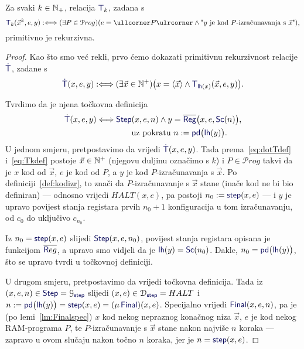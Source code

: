 \begin{propozicija}\label{prop:Tkprn}
Za svaki $k\in{\mathbb N}_+$, relacija $\f T_k$, zadana s
\begin{equation}\label{eq:Tkdef}
    \f T_k(\vec x^k,e,y):\Longleftrightarrow(\exists P\in\mathcal Prog)(e=\kprog{P}\land \text{"$y$ je kod $P$-izračunavanja s $\vec x$"})\text,
\end{equation}
primitivno je rekurzivna.
\end{propozicija}
\begin{proof}
Kao što smo već rekli, prvo ćemo dokazati primitivnu rekurzivnost relacije $\f{\dot T}$, zadane s
\begin{equation}\label{eq:dotTdef}
    \f{\dot T}(x,e,y):\Longleftrightarrow(\exists\vec x\in\N^+)\bigl(x=\langle\vec x\rangle\land\f T_{\f{lh}(x)}(\vec x,e,y)\bigr)\text.
\end{equation}

Tvrdimo da je njena točkovna definicija
\begin{align}
    \dot{\f T}(x,e,y)\Longleftrightarrow\f{Step}&(x,e,n)\land y=\overline{\f{Reg}}\bigl(x,e,\f{Sc}(n)\bigr)\text,\\
    &\text{uz pokratu }n:=\f{pd}\big(\f{lh}(y)\bigr)\text.
\end{align}
U jednom smjeru, pretpostavimo da vrijedi $\f{\dot T}(x,e,y)$. Tada prema~\eqref{eq:dotTdef} i~\eqref{eq:Tkdef} postoje $\vec x\in{\mathbb N}^+$ (njegovu duljinu označimo s $k$) i $P\in\mathcal Prog$ takvi da je $x$ kod od $\vec x$, $e$ je kod od $P$, a $y$ je kod $P$-izračunavanja s $\vec x$. Po definiciji~\ref{def:kodizr}, to znači da $P$-izračunavanje s $\vec x$ stane (inače kod ne bi bio definiran) --- odnosno vrijedi $HALT(x,e)$, pa postoji $n_0:=\f{step}(x,e)$ --- i $y$ je upravo povijest stanja registara prvih $n_0+1$ konfiguracija u tom izračunavanju, od $c_0$ do uključivo $c_{n_0}$.

Iz $n_0=\f{step}(x,e)$ slijedi $\f{Step}(x,e,n_0)$, povijest stanja registara opisana je funkcijom $\overline{\f Reg}$, a upravo smo vidjeli da je $\f{lh}(y)=\f{Sc}(n_0)$. Dakle, $n_0=\f{pd}\bigl(\f{lh}(y)\bigr)$, što se upravo tvrdi u točkovnoj definiciji.

U drugom smjeru, pretpostavimo da vrijedi točkovna definicija. Tada iz $(x,e,n)\in\f{Step}=\graf{\f{step}}$ slijedi $(x,e)\in\dom{\f{step}}=HALT$ i $n:=\f{pd}\bigl(\f{lh}(y)\bigr)=\f{step}(x,e)=(\mu\,\f{Final})(x,e)$. Specijalno vrijedi $\f{Final}(x,e,n)$, pa je (po lemi~\ref{lm:Finalspec}) $x$ kod nekog nepraznog konačnog niza $\vec x$, $e$ je kod nekog RAM-programa $P$, te $P$-izračunavanje s $\vec x$ stane nakon najviše $n$ koraka --- zapravo u ovom slučaju nakon točno $n$ koraka, jer je $n=\f{step}(x,e)$.


\end{proof}
